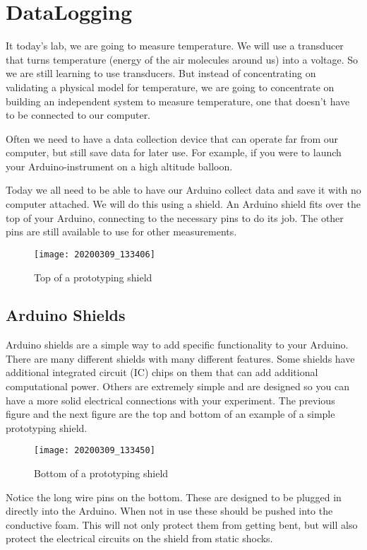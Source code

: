 \chapter{DataLogging}
It today's lab, we are going to measure temperature. We will use a transducer that turns temperature (energy of the air molecules around us) into a voltage. So we are still learning to use transducers. But instead of concentrating on validating a physical model for temperature, we are going to concentrate on building an independent system to measure temperature, one that doesn't have to be connected to our computer.

Often we need to have a data collection device that can operate far from our computer, but still save data for later use. For example, if you were to launch your Arduino-instrument on a high altitude balloon.

Today we all need to be able to have our Arduino collect data and save it with no computer attached. We will do this using a shield. An Arduino shield fits over the top of your Arduino, connecting to the necessary pins to do its job. The other pins are still available to use for other measurements. 

\begin{figure}[h!] 
	\centering
	\caption{Top of a prototyping shield}
	\texttt{[image: 20200309\_133406]}
\end{figure}

\section{Arduino Shields}
	Arduino shields are a simple way to add specific functionality to your Arduino. There are many different shields with many different features. Some shields have additional integrated circuit (IC) chips on them that can add additional computational power.  Others are extremely simple and are designed so you can have a more solid electrical connections with your experiment.  The previous figure and the next figure are the top and bottom of an example of a simple prototyping shield.

	\begin{figure}[h!] 
		\centering
		\caption{Bottom of a prototyping shield}
		\texttt{[image: 20200309\_133450]}
	\end{figure}
	
	Notice the long wire pins on the bottom. These are designed to be plugged in directly into the Arduino. When not in use these should be pushed into the conductive foam. This will not only protect them from getting bent, but will also protect the electrical circuits on the shield from static shocks.
	
